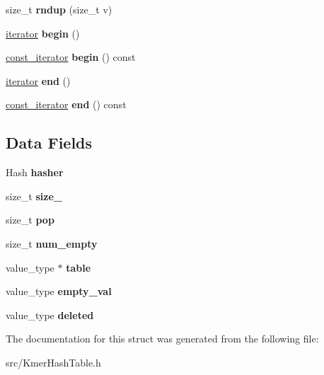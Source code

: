 \begin{DoxyCompactItemize}
size\+\_\+t {\bfseries rndup} (size\+\_\+t v)
\item 
\mbox{\label{structMinimizerHashTable_aead9d9443c95c51a2ff73837c7b377c6}} 
\hyperlink{classMinimizerHashTable_1_1iterator__}{iterator} {\bfseries begin} ()
\item 
\mbox{\label{structMinimizerHashTable_a9148b505a3fa3d024b0de65d12d50a5e}} 
\hyperlink{classMinimizerHashTable_1_1iterator__}{const\+\_\+iterator} {\bfseries begin} () const
\item 
\mbox{\label{structMinimizerHashTable_a308fbaf3a6c1ccdd5413da03adef063d}} 
\hyperlink{classMinimizerHashTable_1_1iterator__}{iterator} {\bfseries end} ()
\item 
\mbox{\label{structMinimizerHashTable_a10e045513caf5536499ce92fc7013bba}} 
\hyperlink{classMinimizerHashTable_1_1iterator__}{const\+\_\+iterator} {\bfseries end} () const
\end{DoxyCompactItemize}
\subsection*{Data Fields}
\begin{DoxyCompactItemize}
\item 
\mbox{\label{structMinimizerHashTable_ad44b0cc90187dcf36892bbdf24c92e4b}} 
Hash {\bfseries hasher}
\item 
\mbox{\label{structMinimizerHashTable_a2f54442c8de626a3bc4b6e15a561f6a7}} 
size\+\_\+t {\bfseries size\+\_\+}
\item 
\mbox{\label{structMinimizerHashTable_a176ce98e9dfb6b119fd1a7ffcffb254c}} 
size\+\_\+t {\bfseries pop}
\item 
\mbox{\label{structMinimizerHashTable_a0eabee5835d87c6151def614c6bf9480}} 
size\+\_\+t {\bfseries num\+\_\+empty}
\item 
\mbox{\label{structMinimizerHashTable_a331d8fde584fbf7d5dbd8c6f051f0294}} 
value\+\_\+type $\ast$ {\bfseries table}
\item 
\mbox{\label{structMinimizerHashTable_a0cd75d5270f758564ef3dedefa7ebc12}} 
value\+\_\+type {\bfseries empty\+\_\+val}
\item 
\mbox{\label{structMinimizerHashTable_ae033d368c3551cdb579c732c30b8eaea}} 
value\+\_\+type {\bfseries deleted}
\end{DoxyCompactItemize}


The documentation for this struct was generated from the following file\+:\begin{DoxyCompactItemize}
\item 
src/Kmer\+Hash\+Table.\+h\end{DoxyCompactItemize}
